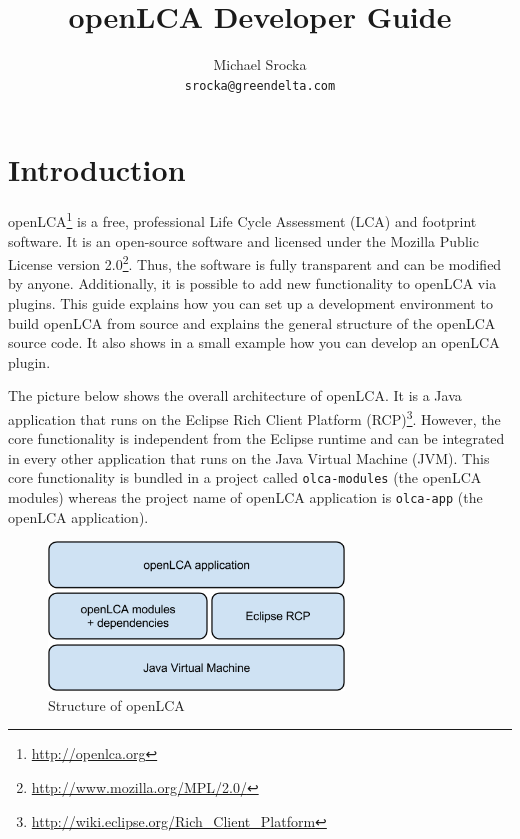 \documentclass{scrreprt}
\begin{document}
\graphicspath{{images/}}

\author{
Michael Srocka \\
\texttt{srocka@greendelta.com}
}

\title{openLCA Developer Guide}

\maketitle

\chapter{Introduction}
openLCA\footnote{\url{http://openlca.org}} is a free, professional Life Cycle Assessment (LCA) and footprint software.  It is an open-source software and licensed under the Mozilla Public License version 2.0\footnote{\url{http://www.mozilla.org/MPL/2.0/}}. Thus, the software is fully transparent and can be modified by anyone. Additionally, it is possible to add new functionality to openLCA via plugins. This guide explains how you can set up a development environment to build openLCA from source and explains the general structure of the openLCA source code. It also shows in a small example how you can develop an openLCA plugin.

The picture below shows the overall architecture of openLCA. It is a Java application that runs on the Eclipse Rich Client Platform (RCP)\footnote{\url{http://wiki.eclipse.org/Rich_Client_Platform}}. However, the core functionality is independent from the Eclipse runtime and can be integrated in every other application that runs on the Java Virtual Machine (JVM). This core functionality is bundled in a project called \texttt{olca-modules} (the openLCA modules) whereas the project name of openLCA application is \texttt{olca-app} (the openLCA application).    

\begin{figure}[H]
\centering
\includegraphics[width=0.7\textwidth]{images/openlca_structure.png}
\caption{Structure of openLCA}
\end{figure} 
\end{document}
